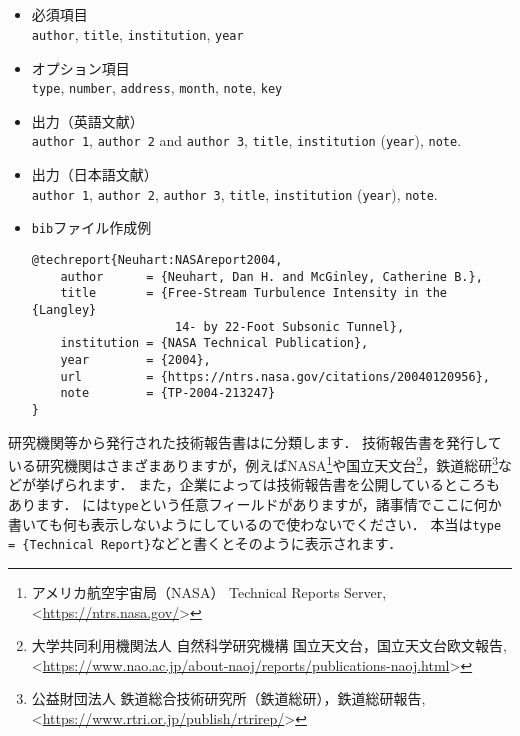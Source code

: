 \documentclass[a4paper,fleqn,uplatex,dvipdfmx]{jsarticle}
\begin{document}
\subsection{\tttechreport}
\label{ssec:techreport}
\begin{screen}
    \begin{itemize}
        \item 必須項目 \\
        \verb|author|, \verb|title|, \verb|institution|, \verb|year|
        \item オプション項目 \\
        \verb|type|, \verb|number|, \verb|address|, \verb|month|, \verb|note|, \verb|key|
        \item 出力（英語文献） \\
            \colorbox[gray]{0.8}{\texttt{author 1}}, \colorbox[gray]{0.8}{\texttt{author 2}} and \colorbox[gray]{0.8}{\texttt{author 3}}, \colorbox[gray]{0.8}{\texttt{title}}, \colorbox[gray]{0.8}{\texttt{institution}} (\colorbox[gray]{0.8}{\texttt{year}}), \colorbox[gray]{0.8}{\texttt{note}}.
        \item 出力（日本語文献） \\
            \colorbox[gray]{0.8}{\texttt{author 1}}, \colorbox[gray]{0.8}{\texttt{author 2}}, \colorbox[gray]{0.8}{\texttt{author 3}}, \colorbox[gray]{0.8}{\texttt{title}}, \colorbox[gray]{0.8}{\texttt{institution}} (\colorbox[gray]{0.8}{\texttt{year}}), \colorbox[gray]{0.8}{\texttt{note}}.
        \item \verb|bib|ファイル作成例 \vspace{-3mm}
\begin{verbatim}
@techreport{Neuhart:NASAreport2004,
    author      = {Neuhart, Dan H. and McGinley, Catherine B.},
    title       = {Free-Stream Turbulence Intensity in the {Langley} 
                    14- by 22-Foot Subsonic Tunnel},
    institution = {NASA Technical Publication},
    year        = {2004},
    url         = {https://ntrs.nasa.gov/citations/20040120956},
    note        = {TP-2004-213247}
}
\end{verbatim}
    \end{itemize}
\end{screen}

研究機関等から発行された技術報告書は\tttechreport に分類します．
技術報告書を発行している研究機関はさまざまありますが，例えばNASA\footnote{アメリカ航空宇宙局（NASA） Technical Reports Server, \textless\url{https://ntrs.nasa.gov/}\textgreater}や国立天文台\footnote{大学共同利用機関法人 自然科学研究機構 国立天文台，国立天文台欧文報告, \textless\url{https://www.nao.ac.jp/about-naoj/reports/publications-naoj.html}\textgreater}，鉄道総研\footnote{公益財団法人 鉄道総合技術研究所（鉄道総研），鉄道総研報告, \textless\url{https://www.rtri.or.jp/publish/rtrirep/}\textgreater}などが挙げられます．
また，企業によっては技術報告書を公開しているところもあります．
\tttechreport には\verb|type|という任意フィールドがありますが，諸事情でここに何か書いても何も表示しないようにしているので使わないでください．
本当は\verb|type = {Technical Report}|などと書くとそのように表示されます．
\end{document}
